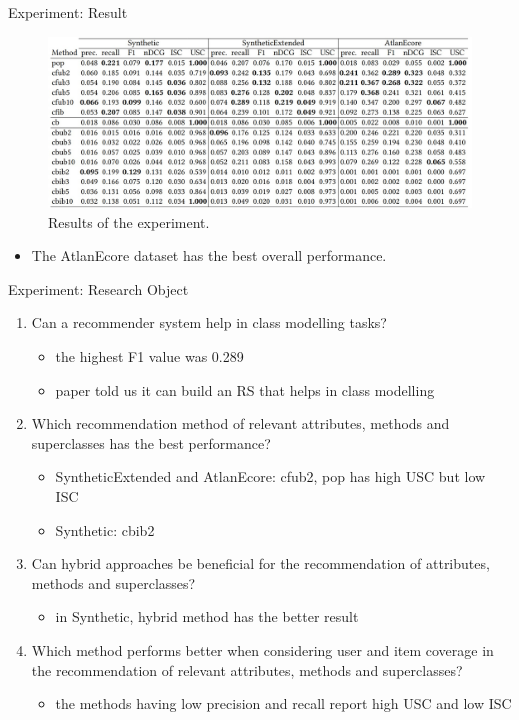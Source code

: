 \documentclass{beamer}
\begin{document}
\begin{frame}{Experiment: Result}
    \begin{figure}
        \centering
        \includegraphics[width = \linewidth]{pic/实验结果.jpg}
        \caption{Results of the experiment. }
    \end{figure}
    \begin{itemize}
        \item The AtlanEcore dataset has the best overall performance.
    \end{itemize}
\end{frame}

\begin{frame}{Experiment: Research Object}
    \begin{enumerate}
        \item Can a recommender system help in class modelling tasks?
        \begin{itemize}
            \item the highest F1 value was 0.289
            \item paper told us it can build an RS that helps in class modelling
        \end{itemize}
        \item Which recommendation method of relevant attributes, methods and superclasses has the best performance?
        \begin{itemize}
            \item SyntheticExtended and AtlanEcore: cfub2, pop has high USC but low ISC
            \item Synthetic: cbib2
        \end{itemize} 
        \item Can hybrid approaches be beneficial for the recommendation of attributes, methods and superclasses?
        \begin{itemize}
            \item in Synthetic, hybrid method has the better result
        \end{itemize}
        \item Which method performs better when considering user and item coverage in the recommendation of relevant attributes, methods and superclasses?
        \begin{itemize}
            \item the methods having low precision and recall report high USC and low ISC
        \end{itemize}
    \end{enumerate}
\end{frame}
\end{document}
